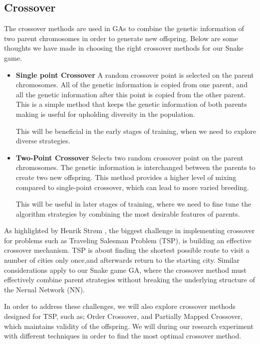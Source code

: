 \documentclass[a4paper, twocolumn]{article}
\begin{document}
\subsection{Crossover\label{sec:Crossover}}
The crossover methods are used in GAs to combine the genetic information of two parent chromosomes in order to generate new offspring. Below are some thoughts we have made in choosing the right crossover methods for our Snake game.

\begin{itemize}
    \item \textbf{Single point Crossover}
A random crossover point is selected on the parent chromosomes. All of the genetic information is copied from one parent, and all the genetic information after this point is copied from the other parent. This is a  simple method that keeps the genetic information of both parents making is useful for upholding diversity in the population.

This will be beneficial in the early stages of training, when we need to explore diverse strategies.
\end{itemize}


\begin{itemize}
    \item \textbf{Two-Point Crossover}
Selects two random crossover point on the parent chromosomes. The genetic information is interchanged between the parents to create two new offspring. This method provides a higher level of mixing compared to single-point crossover, which can lead to more varied breeding.

This will be useful in later stages of training, where we need to fine tune the algorithm strategies by combining the most desirable features of parents.
\end{itemize}

As highlighted by Henrik Strøm \cite{strom2024travelling}, the biggest challenge in implementing crossover for problems such as Traveling Salesman Problem (TSP), is building an effective crossover mechanism. TSP is about finding the shortest possible route to visit a number of cities only once,and afterwards return to the starting city.
Similar considerations apply to our Snake game GA, where the crossover method must effectively combine parent strategies without breaking the underlying structure of the Nerual Network (NN).

In order to address these challenges, we will also explore crossover methods designed for TSP, such as; Order Crossover, and Partially Mapped Crossover, which maintains validity of the offspring. We will during our research experiment with different techniques in order to find the most optimal crossover method.
\end{document}
